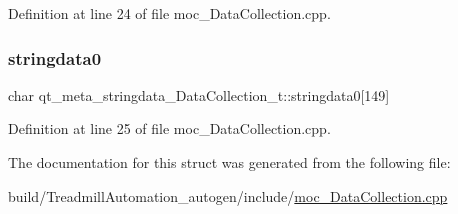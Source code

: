 Definition at line 24 of file moc\+\_\+\+Data\+Collection.\+cpp.

\mbox{\label{structqt__meta__stringdata___data_collection__t_ac1deb762673d2f438fbbc6bef9ee60d4}} 
\subsubsection{\texorpdfstring{stringdata0}{stringdata0}}
{\footnotesize\ttfamily char qt\+\_\+meta\+\_\+stringdata\+\_\+\+Data\+Collection\+\_\+t\+::stringdata0\mbox{[}149\mbox{]}}



Definition at line 25 of file moc\+\_\+\+Data\+Collection.\+cpp.



The documentation for this struct was generated from the following file\+:\begin{DoxyCompactItemize}
\item 
build/\+Treadmill\+Automation\+\_\+autogen/include/\hyperlink{moc___data_collection_8cpp}{moc\+\_\+\+Data\+Collection.\+cpp}\end{DoxyCompactItemize}
